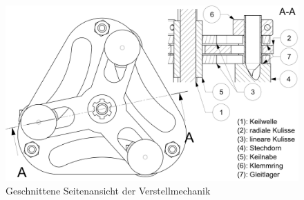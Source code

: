 	\begin{figure}[H]
	\includegraphics[scale=0.63]{Illustrationen/6-Umsetzung/schnitt_vm.jpg}
	\caption{Geschnittene Seitenansicht der Verstellmechanik}
	\label{fig:schnitt_vm}
	\end{figure}

